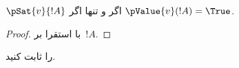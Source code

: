 \documentclass[../../../include/open-logic-section]{subfiles}
\begin{document}
\begin{prop}
  $\pSat{v}{!A}$ اگر و تنها اگر $\pValue{v}(!A) = \True$.
\end{prop}

\begin{proof}
  با استقرا بر~$!A$.
\end{proof}

\begin{prob}
   را ثابت کنید.
\end{prob}
\end{document}
